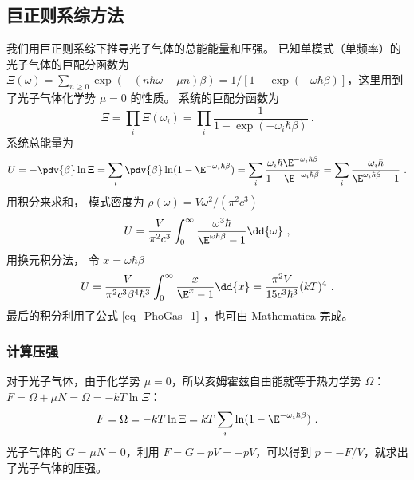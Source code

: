 \subsection{巨正则系综方法}
我们用巨正则系综下推导光子气体的总能能量和压强。 已知单模式（单频率）的光子气体的巨配分函数为 $\Xi(\omega) =\sum_{n\ge 0} \exp(-(n\hbar\omega-\mu n)\beta)= 1/[1-\exp(-\omega\hbar\beta)]$，这里用到了光子气体化学势 $\mu=0$ 的性质。 系统的巨配分函数为
\begin{equation}
\Xi = \prod_i \Xi(\omega_i) = \prod_i \frac{1}{1-\exp(-\omega_i\hbar\beta)}~.
\end{equation}
系统总能量为
\begin{equation}
U = -\pdv{\beta} \ln \Xi = \sum_i \pdv{\beta} \ln(1 - \E^{-\omega_i \hbar \beta}) = \sum_i \frac{\omega_i \hbar \E^{-\omega_i \hbar\beta}}{1-\E^{-\omega_i \hbar \beta}} = \sum_i \frac{\omega_i \hbar}{\E^{\omega_i\hbar\beta} - 1}~.
\end{equation}
用积分来求和， 模式密度为 $\rho(\omega) = V\omega^2/(\pi^2 c^3)$
\begin{equation}
U = \frac{V}{\pi^2 c^3} \int_0^\infty \frac{\omega^3 \hbar}{\E^{\omega\hbar\beta} - 1}\dd{\omega}~,
\end{equation}
用换元积分法， 令 $x = \omega\hbar\beta$
\begin{equation}\label{eq_PhoGas_2}
U = \frac{V}{\pi^2c^3 \beta^4 \hbar^3} \int_0^\infty \frac{x}{\E^x - 1}\dd{x} = \frac{\pi^2 V}{15c^3 \hbar^3} (kT)^4~.
\end{equation}
最后的积分利用了公式 \autoref{eq_PhoGas_1} ，也可由 Mathematica 完成。

\subsubsection{计算压强}
对于光子气体，由于化学势 $\mu=0$，所以亥姆霍兹自由能就等于热力学势 $\Omega$：$F=\Omega+\mu N=\Omega=-kT\ln \Xi$：
\begin{equation}
F =\Omega= -kT \ln \Xi = kT \sum_i \ln(1 - \E^{-\omega_i \hbar\beta})~.
\end{equation}
光子气体的 $G=\mu N=0$，利用 $F=G-pV=-pV$，可以得到 $p=-F/V$，就求出了光子气体的压强。
